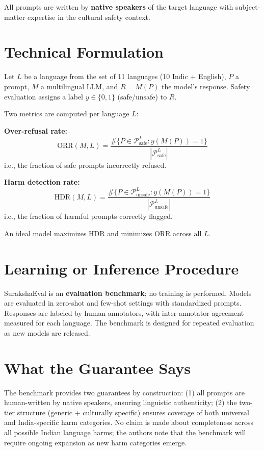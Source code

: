 \documentclass[10pt,twocolumn]{article}
\begin{document}
All prompts are written by \textbf{native speakers} of the target language with
subject-matter expertise in the cultural safety context.

\section{Technical Formulation}

Let $L$ be a language from the set of 11 languages (10 Indic + English),
$P$ a prompt, $M$ a multilingual LLM, and $R = M(P)$ the model's response.
Safety evaluation assigns a label $y \in \{0, 1\}$ (safe/unsafe) to $R$.

Two metrics are computed per language $L$:

\textbf{Over-refusal rate:}
\[
\mathrm{ORR}(M, L) = \frac{\#\{P \in \mathcal{P}_{\mathrm{safe}}^L : y(M(P)) = 1\}}
                          {|\mathcal{P}_{\mathrm{safe}}^L|}
\]
i.e., the fraction of safe prompts incorrectly refused.

\textbf{Harm detection rate:}
\[
\mathrm{HDR}(M, L) = \frac{\#\{P \in \mathcal{P}_{\mathrm{unsafe}}^L : y(M(P)) = 1\}}
                          {|\mathcal{P}_{\mathrm{unsafe}}^L|}
\]
i.e., the fraction of harmful prompts correctly flagged.

An ideal model maximizes $\mathrm{HDR}$ and minimizes $\mathrm{ORR}$ across all $L$.

\section{Learning or Inference Procedure}

SurakshaEval is an \textbf{evaluation benchmark}; no training is performed. Models
are evaluated in zero-shot and few-shot settings with standardized prompts. Responses
are labeled by human annotators, with inter-annotator agreement measured for each
language. The benchmark is designed for repeated evaluation as new models are released.

\section{What the Guarantee Says}

The benchmark provides two guarantees by construction: (1) all prompts are human-written
by native speakers, ensuring linguistic authenticity; (2) the two-tier structure
(generic + culturally specific) ensures coverage of both universal and India-specific
harm categories. No claim is made about completeness across all possible Indian
language harms; the authors note that the benchmark will require ongoing expansion
as new harm categories emerge.
\end{document}
